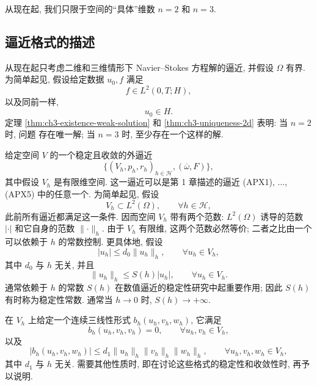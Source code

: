 从现在起, 我们只限于空间的``具体''维数 $n=2$ 和 $n=3$.

\hypertarget{chapter-03-page-240}{}
\subsection{逼近格式的描述}
\label{subsec:ch3-scheme-description}

从现在起只考虑二维和三维情形下 Navier--Stokes 方程解的逼近, 并假设 $\Omega$ 有界. 为简单起见, 假设给定数据 $u_0,f$ 满足
\begin{equation}
f\in L^2(0,T;H),
\label{eq:ch3-discrete-force-data}
\end{equation}
以及同前一样,
\begin{equation}
u_0\in H.
\label{eq:ch3-discrete-initial-data}
\end{equation}
定理 \ref{thm:ch3-existence-weak-solution} 和 \ref{thm:ch3-uniqueness-2d} 表明: 当 $n=2$ 时, 问题  存在唯一解; 当 $n=3$ 时, 至少存在一个这样的解.

给定空间 $V$ 的一个稳定且收敛的外逼近
\[
\{(V_h,p_h,r_h)_{h\in\mathcal H},(\overline\omega,F)\},
\]
其中假设 $V_h$ 是有限维空间. 这一逼近可以是第 1 章描述的逼近 (APX1), $\ldots$, (APX5) 中的任意一个. 为简单起见, 假设
\begin{equation}
V_h\subset L^2(\Omega),\qquad\forall h\in\mathcal H,
\label{eq:ch3-discrete-space-l2-inclusion}
\end{equation}
此前所有逼近都满足这一条件. 因而空间 $V_h$ 带有两个范数: $L^2(\Omega)$ 诱导的范数 $|\cdot|$ 和它自身的范数 $\lVert\cdot\rVert_h$. 由于 $V_h$ 有限维, 这两个范数必然等价; 二者之比由一个可以依赖于 $h$ 的常数控制. 更具体地, 假设
\begin{equation}
|u_h|\leq d_0\lVert u_h\rVert_h,
\qquad\forall u_h\in V_h,
\label{eq:ch3-discrete-norm-lower-bound}
\end{equation}
其中 $d_0$ 与 $h$ 无关, 并且
\begin{equation}
\lVert u_h\rVert_h\leq S(h)|u_h|,
\qquad\forall u_h\in V_h.
\label{eq:ch3-discrete-stability-constant}
\end{equation}
通常依赖于 $h$ 的常数 $S(h)$ 在数值逼近的稳定性研究中起重要作用; 因此 $S(h)$ 有时称为稳定性常数. 通常当 $h\to0$ 时, $S(h)\to+\infty$.

\hypertarget{chapter-03-page-241}{}
在 $V_h$ 上给定一个连续三线性形式 $b_h(u_h,v_h,w_h)$, 它满足
\begin{equation}
b_h(u_h,v_h,v_h)=0,
\qquad\forall u_h,v_h\in V_h,
\label{eq:ch3-discrete-trilinear-cancellation}
\end{equation}
以及
\begin{equation}
|b_h(u_h,v_h,w_h)|\leq d_1\lVert u_h\rVert_h\lVert v_h\rVert_h\lVert w_h\rVert_h,
\qquad\forall u_h,v_h,w_h\in V_h,
\label{eq:ch3-discrete-trilinear-continuity}
\end{equation}
其中 $d_1$ 与 $h$ 无关. 需要其他性质时, 即在讨论这些格式的稳定性和收敛性时, 再予以说明.

